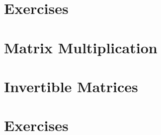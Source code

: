\section*{Exercises}

\section{Matrix Multiplication}

\section{Invertible Matrices}

\section*{Exercises}
